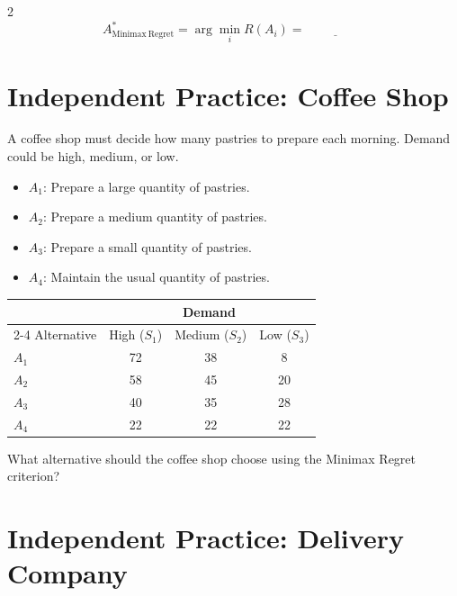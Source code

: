 \begin{multicols}{2}
	\[
	A^*_{\mathrm{Minimax\ Regret}}
	=
	\arg\min_i R(A_i)
	=
	\underline{\hspace{2cm}}
	\]
	
	\newpage
	
	\section{Independent Practice: Coffee Shop}
	
	A coffee shop must decide how many pastries to prepare each morning.
	Demand could be high, medium, or low.
	
	\begin{itemize}
		\item $A_1$: Prepare a large quantity of pastries.
		\item $A_2$: Prepare a medium quantity of pastries.
		\item $A_3$: Prepare a small quantity of pastries.
		\item $A_4$: Maintain the usual quantity of pastries.
	\end{itemize}
	
	\begin{center}
		\renewcommand{\arraystretch}{1.3}
		\small
		\begin{tabular}{lccc}
			\toprule
			& \multicolumn{3}{c}{Demand} \\
			\cmidrule(lr){2-4}
			Alternative & High ($S_1$) & Medium ($S_2$) & Low ($S_3$) \\
			\midrule
			$A_1$ & 72 & 38 & 8 \\
			$A_2$ & 58 & 45 & 20 \\
			$A_3$ & 40 & 35 & 28 \\
			$A_4$ & 22 & 22 & 22 \\
			\bottomrule
		\end{tabular}
	\end{center}
	
	What alternative should the coffee shop choose using the Minimax Regret criterion?
	
	
	\section{Independent Practice: Delivery Company}
	

\end{multicols}

